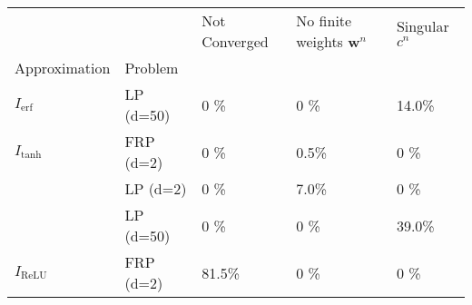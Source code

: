 \begin{tabular}{lllll}
 &  & Not Converged & No finite weights $\bm{{w}}^n$ & Singular $c^n$ \\
Approximation & Problem &  &  &  \\
$I_\text{erf}$ & LP (d=50) & 0 \% & 0 \% & 14.0\% \\
\cline{1-5}
$I_\text{tanh}$ & FRP (d=2) & 0 \% & 0.5\% & 0 \% \\
 & LP (d=2) & 0 \% & 7.0\% & 0 \% \\
 & LP (d=50) & 0 \% & 0 \% & 39.0\% \\
\cline{1-5}
$I_\text{ReLU}$ & FRP (d=2) & 81.5\% & 0 \% & 0 \% \\
\cline{1-5}
\end{tabular}
